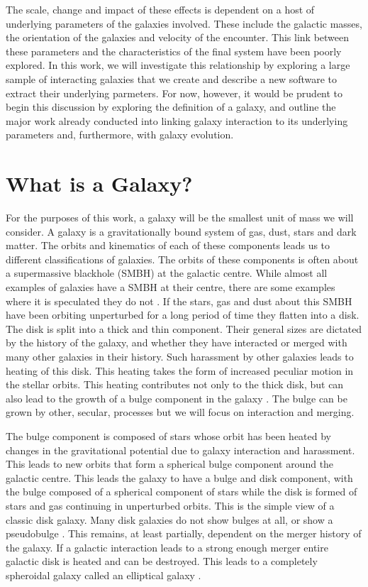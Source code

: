 The scale, change and impact of these effects is dependent on a host of underlying parameters of the galaxies involved. These include the galactic masses, the orientation of the galaxies and velocity of the encounter. This link between these parameters and the characteristics of the final system have been poorly explored. In this work, we will investigate this relationship by exploring a large sample of interacting galaxies that we create and describe a new software to extract their underlying parmeters. For now, however, it would be prudent to begin this discussion by exploring the definition of a galaxy, and outline the major work already conducted into linking galaxy interaction to its underlying parameters and, furthermore, with galaxy evolution.

\section{What is a Galaxy?}
\noindent For the purposes of this work, a galaxy will be the smallest unit of mass we will consider. A galaxy is a gravitationally bound system of gas, dust, stars and dark matter. The orbits and kinematics of each of these components leads us to different classifications of galaxies. The orbits of these components is often about a supermassive blackhole (SMBH) at the galactic centre. While almost all examples of galaxies have a SMBH at their centre, there are some examples where it is speculated they do not \citep{2001AJ....122.2469G}. If the stars, gas and dust about this SMBH have been orbiting unperturbed for a long period of time they flatten into a disk. The disk is split into a thick and thin component. Their general sizes are dictated by the history of the galaxy, and whether they have interacted or merged with many other galaxies in their history. Such harassment by other galaxies leads to heating of this disk. This heating takes the form of increased peculiar motion in the stellar orbits. This heating contributes not only to the thick disk, but can also lead to the growth of a bulge component in the galaxy \citep{2010ApJ...715..202H, 2017ApJ...837L...8B}. The bulge can be grown by other, secular, processes but we will focus on interaction and merging.

The bulge component is composed of stars whose orbit has been heated by changes in the gravitational potential due to galaxy interaction and harassment. This leads to new orbits that form a spherical bulge component around the galactic centre. This leads the galaxy to have a bulge and disk component, with the bulge composed of a spherical component of stars while the disk is formed of stars and gas continuing in unperturbed orbits. This is the simple view of a classic disk galaxy. Many disk galaxies do not show bulges at all, or show a pseudobulge \citep{2009MNRAS.399..621G}. This remains, at least partially, dependent on the merger history of the galaxy. If a galactic interaction leads to a strong enough merger entire galactic disk is heated and can be destroyed. This leads to a completely spheroidal galaxy called an elliptical galaxy \citep{1977egsp.conf..401T, 2006MNRAS.366..499D}.

